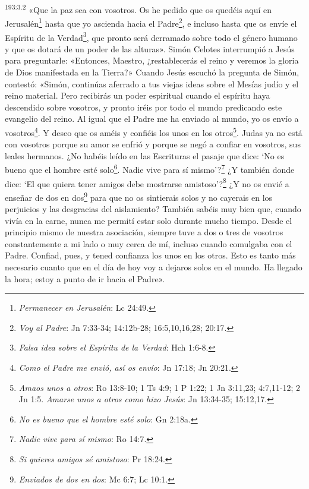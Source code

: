 \par 
\textsuperscript{193:3.2} «Que la paz sea con vosotros. Os he pedido que os quedéis aquí en Jerusalén\footnote{\textit{Permanecer en Jerusalén}: Lc 24:49.} hasta que yo ascienda hacia el Padre\footnote{\textit{Voy al Padre}: Jn 7:33-34; 14:12b-28; 16:5,10,16,28; 20:17.}, e incluso hasta que os envíe el Espíritu de la Verdad\footnote{\textit{Falsa idea sobre el Espíritu de la Verdad}: Hch 1:6-8.}, que pronto será derramado sobre todo el género humano y que os dotará de un poder de las alturas». Simón Celotes interrumpió a Jesús para preguntarle: «Entonces, Maestro, ¿restablecerás el reino y veremos la gloria de Dios manifestada en la Tierra?» Cuando Jesús escuchó la pregunta de Simón, contestó: «Simón, continúas aferrado a tus viejas ideas sobre el Mesías judío y el reino material. Pero recibirás un poder espiritual cuando el espíritu haya descendido sobre vosotros, y pronto iréis por todo el mundo predicando este evangelio del reino. Al igual que el Padre me ha enviado al mundo, yo os envío a vosotros\footnote{\textit{Como el Padre me envió, así os envío}: Jn 17:18; Jn 20:21.}. Y deseo que os améis y confiéis los unos en los otros\footnote{\textit{Amaos unos a otros}: Ro 13:8-10; 1 Ts 4:9; 1 P 1:22; 1 Jn 3:11,23; 4:7,11-12; 2 Jn 1:5. \textit{Amarse unos a otros como hizo Jesús}: Jn 13:34-35; 15:12,17.}. Judas ya no está con vosotros porque su amor se enfrió y porque se negó a confiar en vosotros, sus leales hermanos. ¿No habéis leído en las Escrituras el pasaje que dice: `No es bueno que el hombre esté solo\footnote{\textit{No es bueno que el hombre esté solo}: Gn 2:18a.}. Nadie vive para sí mismo'?\footnote{\textit{Nadie vive para sí mismo}: Ro 14:7.} ¿Y también donde dice: `El que quiera tener amigos debe mostrarse amistoso'?\footnote{\textit{Si quieres amigos sé amistoso}: Pr 18:24.} ¿Y no os envié a enseñar de dos en dos\footnote{\textit{Enviados de dos en dos}: Mc 6:7; Lc 10:1.} para que no os sintierais solos y no cayerais en los perjuicios y las desgracias del aislamiento? También sabéis muy bien que, cuando vivía en la carne, nunca me permití estar solo durante mucho tiempo. Desde el principio mismo de nuestra asociación, siempre tuve a dos o tres de vosotros constantemente a mi lado o muy cerca de mí, incluso cuando comulgaba con el Padre. Confiad, pues, y tened confianza los unos en los otros. Esto es tanto más necesario cuanto que en el día de hoy voy a dejaros solos en el mundo. Ha llegado la hora; estoy a punto de ir hacia el Padre».

